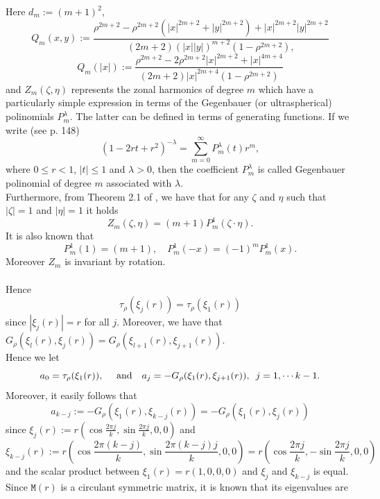 \documentclass[11pt,a4paper]{amsart}
\theoremstyle{definition}
\renewcommand{\(}{\left(}
\renewcommand{\)}{\right)}
\begin{document}
Here $d_m:=(m+1)^2$,
\begin{equation}\label{Qmxy}
Q_m(x, y):=\frac{\rho^{2m+2} - \rho^{2m+2}(|x|^{2m+2}+|y|^{2m+2}) + |x|^{2m+2}|y|^{2m+2}}{(2m+2)(|x||y|)^{m+2}(1-\rho^{2m+2}),}\end{equation}
\begin{equation}\label{Qmx}
Q_m(|x|):=\frac{\rho^{2m+2} - 2\rho^{2m+2}|x|^{2m+2} + |x|^{4m+4}}{(2m+2)|x|^{2m+4}(1-\rho^{2m+2})}\end{equation}
and
$Z_m(\zeta, \eta)$ represents the zonal harmonics of degree $m$ which have a particularly simple expression in terms of the Gegenbauer (or ultraspherical) polinomials $P_{m}^{\lambda}$. The latter can be defined in terms of generating functions. If we write (see \cite{SW} p. 148)
\begin{equation*}
(1-2rt+r^{2})^{-\lambda} = \sum_{m=0}^{\infty} P_m^{\lambda}(t)r^{m},
\end{equation*}
where $0 \leq r<1$, $|t| \leq 1$ and $\lambda>0$, then the coefficient $P_m^{\lambda}$ is called Gegenbauer polinomial of degree $m$ associated with $\lambda$. \ \\
Furthermore, from Theorem 2.1 of \cite{GV}, we have that for any $\zeta$ and $\eta$ such that $|\zeta|=1$ and $|\eta|=1$ it holds
\begin{equation*}
Z_{m}(\zeta,\eta) = (m+1)P_{m}^{1}(\zeta\cdot\eta).
\end{equation*}
It is also known that $$P_m^1(1)=(m+1),\quad P_m^1(-x)=(-1)^mP_m^1(x).$$
Moreover $Z_{m}$ is invariant by rotation.\\\\ Hence $$\tau_\rho(\xi_j(r))=\tau_\rho(\xi_1(r))$$ since 
$|\xi_j(r)|=r$ for all $j$. Moreover, we have that $G_\rho(\xi_{l}(r), \xi_{j}(r)) = G_\rho(\xi_{l+1}(r), \xi_{j+1}(r))$. \\ Hence we let
$$a_0 = \tau_\rho(\xi_{1}(r)),\quad\hbox{ and}\quad 
a_{j} = - G_\rho(\xi_{1}(r), \xi_{j+1}(r)),\,\ j=1, \cdots k-1.
$$
Moreover, it easily follows that $$a_{k-j}:=-G_\rho(\xi_{1}(r), \xi_{k-j}(r))=-G_\rho(\xi_{1}(r), \xi_j(r))$$
since $\xi_j(r):=r\left(\cos\frac{2\pi j}{k}, \sin\frac{2\pi j}{k}, 0, 0 \right)$ and $$\xi_{k-j}(r):=r\left(\cos\frac{2\pi (k-j)}{k}, \sin\frac{2\pi (k-j)j}{k}, 0, 0 \right)=r\left(\cos\frac{2\pi j}{k}, -\sin\frac{2\pi j}{k}, 0, 0 \right)$$ and the scalar product between $\xi_1(r)=r(1, 0, 0, 0)$ and $\xi_j$ and $\xi_{k-j}$ is equal.\\
Since $\mathtt M(r)$ is a circulant symmetric matrix, it is known that its eigenvalues  are  
\end{document}
